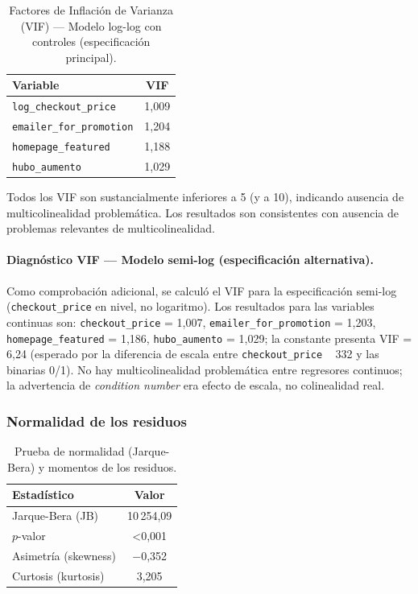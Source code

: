 \documentclass[doc, a4paper, biblatex, floatsintext, longtable, babel]{apa7}
\begin{document}
\begin{table}[!htbp]
\centering
\caption{Factores de Inflaci\'on de Varianza (VIF) --- Modelo log-log con controles (especificación principal).}
\label{tab:vif_resultados}
\begin{tabular}{lc}
\toprule
Variable & VIF \\
\midrule
\texttt{log\_checkout\_price} & 1,009 \\
\texttt{emailer\_for\_promotion} & 1,204 \\
\texttt{homepage\_featured} & 1,188 \\
\texttt{hubo\_aumento} & 1,029 \\
\bottomrule
\end{tabular}
\end{table}

Todos los VIF son sustancialmente inferiores a 5 (y a 10), indicando ausencia de multicolinealidad problem\'atica. Los resultados son consistentes con ausencia de problemas relevantes de multicolinealidad.

\paragraph{Diagnóstico VIF --- Modelo semi-log (especificación alternativa).} Como comprobación adicional, se calculó el VIF para la especificación semi-log (\texttt{checkout\_price} en nivel, no logaritmo). Los resultados para las variables continuas son: \texttt{checkout\_price} = 1,007, \texttt{emailer\_for\_promotion} = 1,203, \texttt{homepage\_featured} = 1,186, \texttt{hubo\_aumento} = 1,029; la constante presenta VIF = 6,24 (esperado por la diferencia de escala entre \texttt{checkout\_price} ~ 332 y las binarias 0/1). No hay multicolinealidad problemática entre regresores continuos; la advertencia de \textit{condition number} era efecto de escala, no colinealidad real.

\subsubsection{Normalidad de los residuos}
\label{subsec:normalidad}

\begin{table}[!htbp]
\centering
\caption{Prueba de normalidad (Jarque-Bera) y momentos de los residuos.}
\label{tab:normalidad}
\begin{tabular}{lc}
\toprule
Estad\'istico & Valor \\
\midrule
Jarque-Bera (JB) & 10\,254,09 \\
$p$-valor & <0,001 \\
Asimetr\'ia (skewness) & $-$0,352 \\
Curtosis (kurtosis) & 3,205 \\
\bottomrule
\end{tabular}
\end{table}
\end{document}
